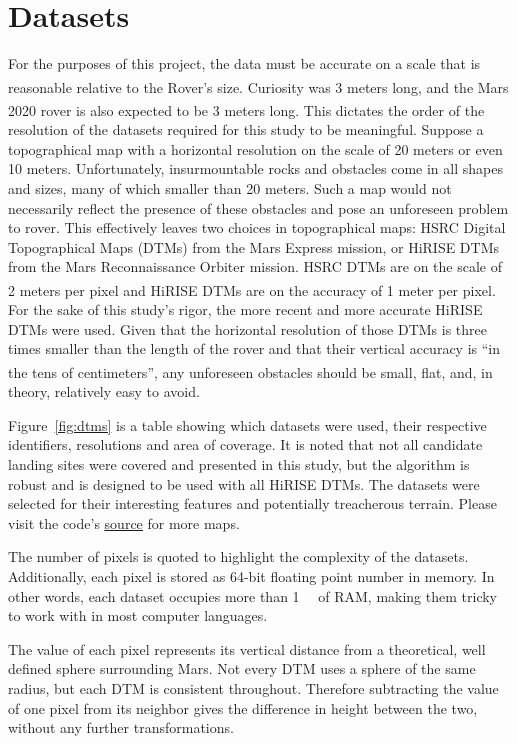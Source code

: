 \documentclass[12pt]{article}
\newcommand{\source}{\href{https://github.com/PapaCharlie/Rover-Climb-Angles/tree/master/figures/maps/}{\ttfamily\color{blue} \underline{source}}}
\newcommand{\supcite}[1]{\textsuperscript{\cite{#1}}}
\begin{document}
\section{Datasets}
\label{sec:datasets}
\par For the purposes of this project, the data must be accurate on a scale that is reasonable relative to the Rover's size. Curiosity was 3 meters long\supcite{bib:curiosity}, and the Mars 2020 rover is also expected to be 3 meters long\supcite{bib:rover2020}. This dictates the order of the resolution of the datasets required for this study to be meaningful. Suppose a topographical map with a horizontal resolution on the scale of 20 meters or even 10 meters. Unfortunately, insurmountable rocks and obstacles come in all shapes and sizes, many of which smaller than 20 meters. Such a map would not necessarily reflect the presence of these obstacles and pose an unforeseen problem to rover. This effectively leaves two choices in topographical maps: HSRC Digital Topographical Maps (DTMs) from the Mars Express mission, or HiRISE DTMs from the Mars Reconnaissance Orbiter mission. HSRC DTMs are on the scale of 2 meters per pixel\supcite{bib:hsrc} and HiRISE DTMs are on the accuracy of 1 meter per pixel\supcite{bib:abouthirise}. For the sake of this study's rigor, the more recent and more accurate HiRISE DTMs were used. Given that the horizontal resolution of those DTMs is three times smaller than the length of the rover and that their vertical accuracy is ``in the tens of centimeters''\supcite{bib:abouthirise}, any unforeseen obstacles should be small, flat, and, in theory, relatively easy to avoid.
\par Figure~\ref{fig:dtms} is a table showing which datasets were used, their respective identifiers, resolutions and area of coverage. It is noted that not all candidate landing sites were covered and presented in this study, but the algorithm is robust and is designed to be used with all HiRISE DTMs. The datasets were selected for their interesting features and potentially treacherous terrain. Please visit the code's \source{} for more maps.
\par The number of pixels is quoted to highlight the complexity of the datasets. Additionally, each pixel is stored as 64-bit floating point number in memory. In other words, each dataset occupies more than \SI{1}{\giga\byte} of RAM, making them tricky to work with in most computer languages.
\par The value of each pixel represents its vertical distance from a theoretical, well defined sphere surrounding Mars. Not every DTM uses a sphere of the same radius, but each DTM is consistent throughout. Therefore subtracting the value of one pixel from its neighbor gives the difference in height between the two, without any further transformations.
\end{document}
